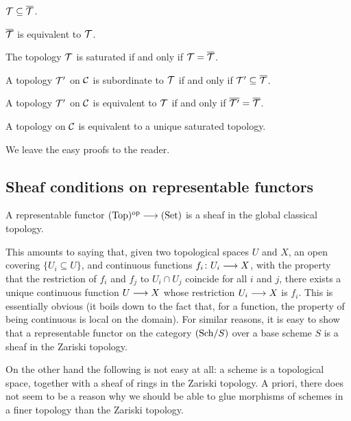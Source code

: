 \begin{2   CONTRAVARIANT FUNCTORS}
\begin{2.3 Sheaves in Grothendieck topologies}
\begin{proposition}
\begin{enumeratei}
\item $\mathcal{T} \subseteq \overline{\mathcal{T}}$.

\item $\overline{\mathcal{T}}$ is equivalent to $\mathcal{T}$.

\item The topology $\mathcal{T}$ is saturated if and only if $\mathcal{T} = \overline{\mathcal{T}}$.

\item A topology $\mathcal{T}'$ on $\mathcal{C}$ is subordinate to $\mathcal{T}$ if and only if $\mathcal{T}' \subseteq \overline{\mathcal{T}}$.

\item A topology $\mathcal{T}'$ on $\mathcal{C}$ is equivalent to $\mathcal{T}$ if and only if $\overline{\mathcal{T}'} =
\overline{\mathcal{T}}$.

\item A topology on $\mathcal{C}$ is equivalent to a unique saturated topology.

\end{enumeratei}
\end{proposition}

We leave the easy proofs to the reader.




\subsection{Sheaf conditions on representable functors}


\begin{proposition}\label{prop:rep->sheaf}
A representable functor $\cattop\op \arr \catset$ is a sheaf in the global classical topology.
\end{proposition}

This amounts to saying that, given two topological spaces $U$ and $X$, an open covering $\{U_i \subseteq U\}$, and continuous functions $f_i \colon U_i \arr X$, with the property that the restriction of $f_i$ and $f_j$ to $U_i \cap U_j$ coincide for all $i$ and $j$, there exists a unique continuous function $U \arr X$ whose restriction $U_{i} \arr X$ is $f_{i}$. This is essentially obvious (it boils down to the fact that, for a function, the property of being continuous is local on the domain). For similar reasons, it is easy to show that a representable functor on the category $({\mathrm{Sch}/S})$ over a base scheme $S$ is a sheaf in the Zariski topology.

On the other hand the following is not easy at all: a scheme is a topological space, together with a sheaf of rings in the Zariski topology. A priori, there does not seem to be a reason why we should be able to glue morphisms of schemes in a finer topology than the Zariski topology.



\end{2.3 Sheaves in Grothendieck topologies}
\end{2   CONTRAVARIANT FUNCTORS}
